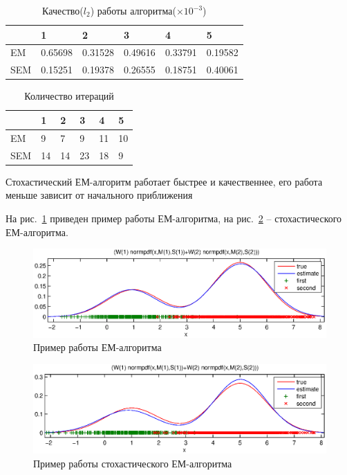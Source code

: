 \documentclass[10pt, a4paper]{article}
\begin{document}
\begin{table}[h]
    \begin{tabular}{|l|l|l|l|l|l|}
        \hline
        &1&2&3&4&5\\
        \hline
        EM&0.65698&0.31528&0.49616&0.33791&0.19582\\
        \hline
        SEM&0.15251&0.19378&0.26555&0.18751&0.40061\\
        \hline
    \end{tabular}
    \caption{Качество($l_2$) работы алгоритма($\times 10^{-3}$)}
    \label{rate}
\end{table}

\begin{table}[h]
    \begin{tabular}{|l|l|l|l|l|l|}
        \hline
        &1&2&3&4&5\\
        \hline
        EM&9&7&9&11&10\\
        \hline
        SEM&14&14&23&18&9\\
        \hline
    \end{tabular}
    \caption{Количество итераций}
    \label{iter}
\end{table}

Стохастический ЕМ-алгоритм работает быстрее и качественнее, его работа меньше зависит от начального
приближения

На рис.~\ref{EM1} приведен пример работы ЕМ-алгоритма, на рис.~\ref{SEM1} -- стохастического ЕМ-алгоритма.
\begin{figure}[h]
    \includegraphics[width=\textwidth]{EM1.eps}
    \caption{Пример работы ЕМ-алгоритма}
    \label{EM1}
\end{figure}
\begin{figure}[h]
    \includegraphics[width=\textwidth]{SEM1.eps}
    \caption{Пример работы стохастического ЕМ-алгоритма}
    \label{SEM1}
\end{figure}
\end{document}
